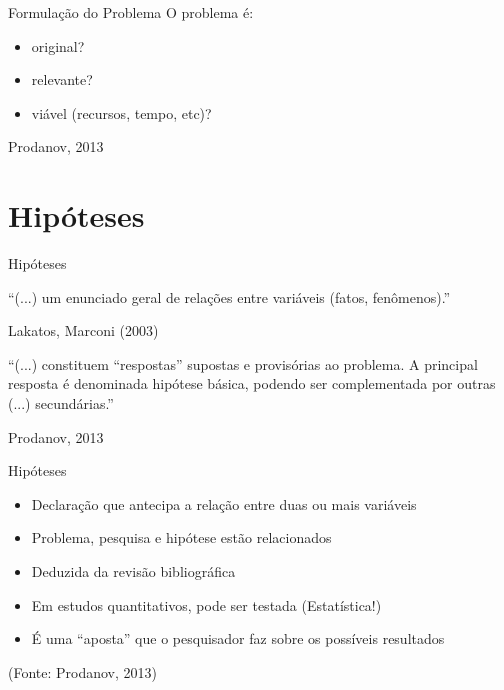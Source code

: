\documentclass{beamer}
\begin{document}
\begin{frame}{Formulação do Problema}
O problema é:
  \begin{itemize}
  \item original?
  \item relevante?
  \item viável (recursos, tempo, etc)?
  \end{itemize}
Prodanov, 2013
\end{frame}

\section{Hipóteses}


\begin{frame}{Hipóteses}
  \begin{block}{}
    ``(...) um enunciado geral de \alert{relações entre variáveis}
    (fatos, fenômenos).''

\bigskip

Lakatos, Marconi (2003)
  \end{block}
  \begin{block}{}
    ``(...) constituem ``respostas'' supostas e provisórias ao
    problema. A principal resposta é denominada hipótese básica,
    podendo ser complementada por outras (...) secundárias.''

    \bigskip
    Prodanov, 2013
  \end{block}
\end{frame}

\begin{frame}{Hipóteses}
  \begin{itemize}
  \item Declaração que antecipa a relação entre duas ou mais variáveis
  \item Problema, pesquisa e hipótese estão relacionados
  \item Deduzida da revisão bibliográfica
  \item Em estudos quantitativos, pode ser testada (Estatística!)
  \item É uma ``aposta'' que o pesquisador faz sobre os possíveis
    resultados
  \end{itemize}
  (Fonte: Prodanov, 2013)
\end{frame}
\end{document}
